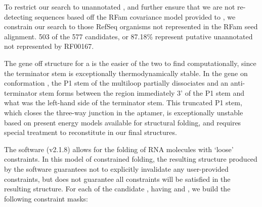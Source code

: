 To restrict our search to unannotated \grbs, and further ensure that we are not
re-detecting sequences based off the RFam covariance model provided to \infernal,
we constrain our search to those RefSeq organisms not represented in the RFam seed
alignment. 503 of the 577 candidates, or 87.18\% represent putative unannotated
\rbs not represented by RF00167.

The gene off structure \strOff for a \grb is the easier of the two to find
computationally, since the terminator stem is exceptionally thermodynamically
stable. In the gene on conformation \strOn, the P1 stem of the multiloop partially
dissociates and an anti-terminator stem forms between the region immediately 3' of
the P1 stem and what was the left-hand side of the terminator stem. This truncated
P1 stem, which closes the three-way junction in the aptamer, is exceptionally
unstable based on present energy models available for structural folding, and
requires special treatment to reconstitute in our final structures.

The software \rfold (v2.1.8) allows for the folding of RNA molecules with `loose'
constraints. In this model of constrained folding, the resulting structure
produced by the software guarantees not to explicitly invalidate any user-provided
constraints, but does not guarantee all constraints will be satisfied in the
resulting structure. For each of the candidate \grbs, having \treeFor{\infernal}
and \treeFor{\tthp}, we build the following constraint masks:
\clearpage

